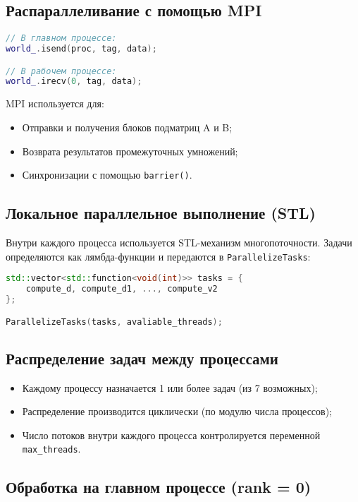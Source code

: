 \documentclass[14pt,a4paper]{extarticle}
\begin{document}
\subsection*{Распараллеливание с помощью MPI}

\begin{lstlisting}[language=C++]
// В главном процессе:
world_.isend(proc, tag, data);

// В рабочем процессе:
world_.irecv(0, tag, data);
\end{lstlisting}

MPI используется для:
\begin{itemize}
    \item Отправки и получения блоков подматриц A и B;
    \item Возврата результатов промежуточных умножений;
    \item Синхронизации с помощью \texttt{barrier()}.
\end{itemize}

\subsection*{Локальное параллельное выполнение (STL)}

Внутри каждого процесса используется STL-механизм многопоточности. Задачи определяются как лямбда-функции и передаются в \texttt{ParallelizeTasks}:

\begin{lstlisting}[language=C++]
std::vector<std::function<void(int)>> tasks = {
    compute_d, compute_d1, ..., compute_v2
};

ParallelizeTasks(tasks, avaliable_threads);
\end{lstlisting}

\subsection*{Распределение задач между процессами}

\begin{itemize}
  \item Каждому процессу назначается 1 или более задач (из 7 возможных);
  \item Распределение производится циклически (по модулю числа процессов);
  \item Число потоков внутри каждого процесса контролируется переменной \texttt{max\_threads}.
\end{itemize}

\subsection*{Обработка на главном процессе (rank = 0)}
\end{document}
